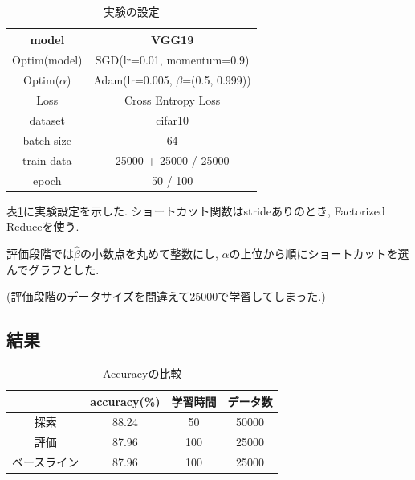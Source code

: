 \documentclass[twocolumn]{jarticle}     %
\begin{document}
\begin{table}[tb]
  \begin{center}
    \caption{実験の設定}
    \begin{tabular}{|c|c|} \hline
      model & VGG19 \\ \hline
      Optim(model) & SGD(lr=0.01, momentum=0.9) \\ \hline
      Optim($\alpha$) & Adam(lr=0.005, $\beta$=(0.5, 0.999)) \\ \hline
      Loss & Cross Entropy Loss \\ \hline
      dataset & cifar10 \\ \hline
      batch size & 64 \\ \hline
      train data & 25000 + 25000 / 25000 \\ \hline
      epoch & 50 / 100 \\ \hline
    \end{tabular}
    \label{tab:setting}
  \end{center}
\end{table}

表\ref{tab:setting}に実験設定を示した.
ショートカット関数はstrideありのとき, Factorized Reduceを使う.

評価段階では$\hat{\beta}$の小数点を丸めて整数にし, $\alpha$の上位から順にショートカットを選んでグラフとした.

(評価段階のデータサイズを間違えて25000で学習してしまった.)

\subsection{結果}

\begin{table}[tb]
  \begin{center}
    \caption{Accuracyの比較}
    \begin{tabular}{|c||c|c|c|} \hline
       & accuracy(\%) & 学習時間 & データ数 \\ \hline \hline
      探索 & 88.24 & 50 & 50000 \\ \hline
      評価 & 87.96 & 100 & 25000 \\ \hline
      ベースライン & 87.96 & 100 & 25000 \\ \hline
    \end{tabular}
    \label{tab:acc}
  \end{center}
\end{table}
\end{document}
